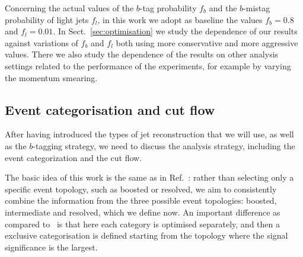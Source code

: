 Concerning the actual values of the $b$-tag probability $f_b$ and
the $b$-mistag probability of light jets $f_l$, in this work
we adopt as baseline the values $f_b=0.8$ and $f_l=0.01$.
%
In Sect.~\ref{sec:optimisation} we study the dependence of
our results against variations of $f_b$ and $f_l$ both
using more conservative and more aggressive values.
%
There we also study the dependence of the results
on other analysis settings related to the performance of
the experiments, for example by varying the momentum smearing.

\subsection{Event categorisation and cut flow}

After having introduced the types of jet reconstruction
that we will use, as well as the $b$-tagging strategy,
we need to discuss the analysis strategy, including
the event categorization and the cut flow.

The basic idea of this work is the same as in Ref.~\cite{Gouzevitch:2013qca}:
rather than selecting only a specific event topology, such as boosted
or resolved, we aim to consistently combine the information from
the three possible event topologies: boosted, intermediate and
resolved, which we define now.
%
An important difference as compared to~\cite{Gouzevitch:2013qca}
is that here each category is optimised separately, and then
a exclusive categorisation is defined starting from the topology
where the signal significance is the largest.


